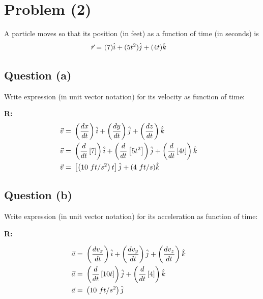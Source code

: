 \section{Problem (2)}

	A particle moves so that its position (in feet) as a function of time (in seconds) is
	\begin{align}
		\vec{r} = \ &(7)\hat{i} + (5t^{2})\hat{j} + (4t)\hat{k}& \notag
	\end{align}

	\subsection{Question (a)}

		Write expression (in unit vector notation) for its velocity as function of time:

		\textbf{R:} \newline
		\begin{align}
			\vec{v} = \ &
			\left( \frac{dx}{dt} \right)\hat{i}
			+ \left( \frac{dy}{dt} \right)\hat{j}
			+ \left( \frac{dz}{dt} \right)\hat{k}
			& \notag \\
			\vec{v} = \ &
			\left( \frac{d}{dt}\left[ 7 \right] \right)\hat{i}
			+ \left( \frac{d}{dt}\left[ 5t^{2} \right] \right)\hat{j}
			+ \left( \frac{d}{dt}\left[ 4t \right] \right)\hat{k}
			& \notag \\
			\vec{v} = \ &
			\left[ \left( 10 \ ft/s^{2} \right) t \right] \hat{j}
			+ (4 \ ft/s ) \hat{k}
			&
		\end{align}
	\subsection{Question (b)}

		Write expression (in unit vector notation) for its acceleration as function of time:

		\textbf{R:} \newline

		\begin{align}
			\vec{a} = \ &
			\left( \frac{dv_{x}}{dt} \right)\hat{i}
			+ \left( \frac{dv_{y}}{dt} \right)\hat{j}
			+ \left( \frac{dv_{z}}{dt} \right)\hat{k}
			& \notag \\
			\vec{a} = \ &
			\left( \frac{d}{dt}\left[ 10t \right] \right)\hat{j}
			+ \left( \frac{d}{dt}\left[ 4 \right] \right)\hat{k}
			& \notag \\
			\vec{a} = \ &\left( 10 \ ft/s^{2} \right) \hat{j}
			&
		\end{align}
